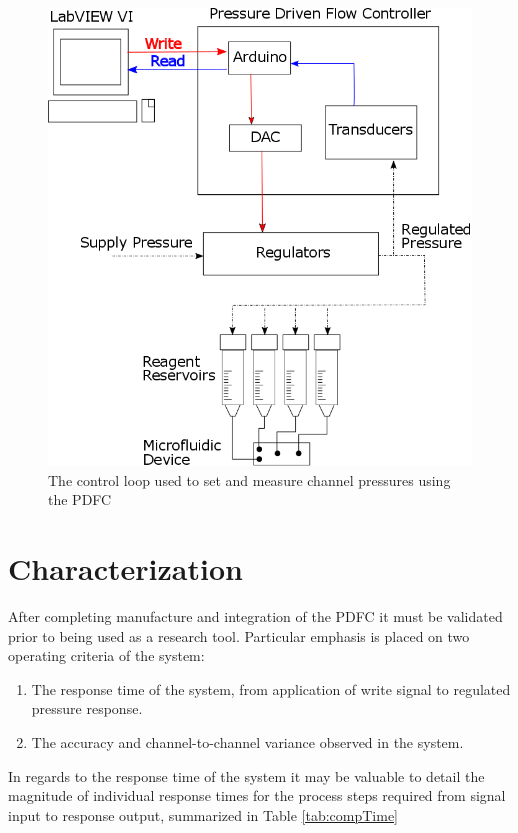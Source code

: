 \begin{figure}[H]
\centering 
\includegraphics[width=1.0\columnwidth]{systemOverview.PNG} 
\caption[System Overview of the PDFC]{The control loop used to set and measure channel pressures using the PDFC} 
\label{fig:systemOverview} 
\end{figure}

\clearpage

\section{Characterization}
\label{sec:characterization}


After completing manufacture and integration of the PDFC it must be validated prior to being used as a research tool. Particular emphasis is placed on two operating criteria of the system:
\begin{enumerate}
\item The response time of the system, from application of write signal to regulated pressure response.
\item The accuracy and channel-to-channel variance observed in the system.
\end{enumerate}

In regards to the response time of the system it may be valuable to detail the magnitude of individual response times for the process steps required from signal input to response output, summarized in Table \vref{tab:compTime}


